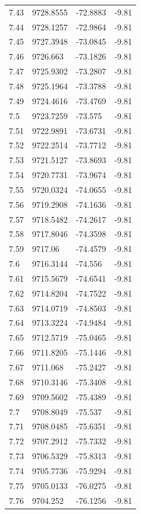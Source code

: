 \begin{table}[H]
\begin{tabular}{llll}
7.43 & 9728.8555 & -72.8883 & -9.81 \\
7.44 & 9728.1257 & -72.9864 & -9.81 \\
7.45 & 9727.3948 & -73.0845 & -9.81 \\
7.46 & 9726.663 & -73.1826 & -9.81 \\
7.47 & 9725.9302 & -73.2807 & -9.81 \\
7.48 & 9725.1964 & -73.3788 & -9.81 \\
7.49 & 9724.4616 & -73.4769 & -9.81 \\
7.5 & 9723.7259 & -73.575 & -9.81 \\
7.51 & 9722.9891 & -73.6731 & -9.81 \\
7.52 & 9722.2514 & -73.7712 & -9.81 \\
7.53 & 9721.5127 & -73.8693 & -9.81 \\
7.54 & 9720.7731 & -73.9674 & -9.81 \\
7.55 & 9720.0324 & -74.0655 & -9.81 \\
7.56 & 9719.2908 & -74.1636 & -9.81 \\
7.57 & 9718.5482 & -74.2617 & -9.81 \\
7.58 & 9717.8046 & -74.3598 & -9.81 \\
7.59 & 9717.06 & -74.4579 & -9.81 \\
7.6 & 9716.3144 & -74.556 & -9.81 \\
7.61 & 9715.5679 & -74.6541 & -9.81 \\
7.62 & 9714.8204 & -74.7522 & -9.81 \\
7.63 & 9714.0719 & -74.8503 & -9.81 \\
7.64 & 9713.3224 & -74.9484 & -9.81 \\
7.65 & 9712.5719 & -75.0465 & -9.81 \\
7.66 & 9711.8205 & -75.1446 & -9.81 \\
7.67 & 9711.068 & -75.2427 & -9.81 \\
7.68 & 9710.3146 & -75.3408 & -9.81 \\
7.69 & 9709.5602 & -75.4389 & -9.81 \\
7.7 & 9708.8049 & -75.537 & -9.81 \\
7.71 & 9708.0485 & -75.6351 & -9.81 \\
7.72 & 9707.2912 & -75.7332 & -9.81 \\
7.73 & 9706.5329 & -75.8313 & -9.81 \\
7.74 & 9705.7736 & -75.9294 & -9.81 \\
7.75 & 9705.0133 & -76.0275 & -9.81 \\
7.76 & 9704.252 & -76.1256 & -9.81 \\

\end{tabular}
\end{table}
